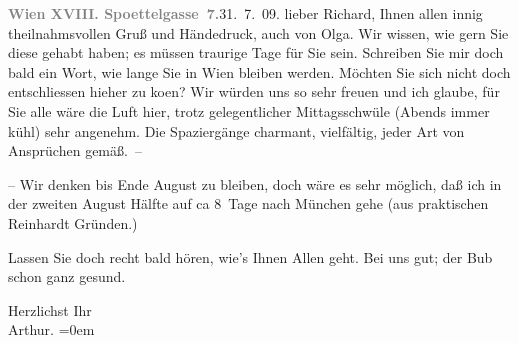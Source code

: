 \pstart
           \textcolor{gray}{\textbf{Wien XVIII. Spoettelgasse 7.}}\hfill 31. 7. 09.\pend
           \vspace{0.5em}
\pstart
           lieber Richard, Ihnen allen innig theilnahmsvollen Gruß und
               Händedruck, auch von Olga. Wir wissen, wie gern
               Sie diese \label{K_L01862-1v}\label{K_L01862-1} gehabt haben; es müssen traurige
               Tage für Sie sein. Schreiben Sie mir doch bald ein Wort, {\pb}wie lange Sie in Wien bleiben werden. Möchten Sie sich nicht doch entschliessen hieher zu
                  ko{\geminationm}en? Wir würden uns so sehr freuen und ich glaube,
               für Sie alle wäre die Luft hier, trotz gelegentlicher Mittagsschwüle (Abends immer
               kühl) sehr angenehm. Die Spaziergänge charmant, vielfältig, jeder {\pb}Art von Ansprüchen gemäß. –\pend
           
\pstart
           – Wir denken bis Ende August zu bleiben, doch wäre es sehr möglich, daß
               ich in der zweiten August Hälfte auf ca 8 Tage nach München gehe (aus praktischen Reinhardt Gründen.)\pend
           
\pstart
           Lassen Sie doch recht bald hören, wie’s Ihnen Allen geht. Bei uns gut; der Bub schon {\pb}ganz gesund.\pend
           
\pstart
           Herzlichst Ihr{\\[\baselineskip]}\spacefill\mbox{Arthur.}\pend
           \leftskip=0em{}\endnumbering{}  \newcommand{\dateiname}{L01862}\newcommand{\titel}{Arthur Schnitzler an Richard Beer-Hofmann, 31. 7. 1909}\newcommand{\editorInnen}{Martin Anton Müller und Gerd-Hermann Susen}
